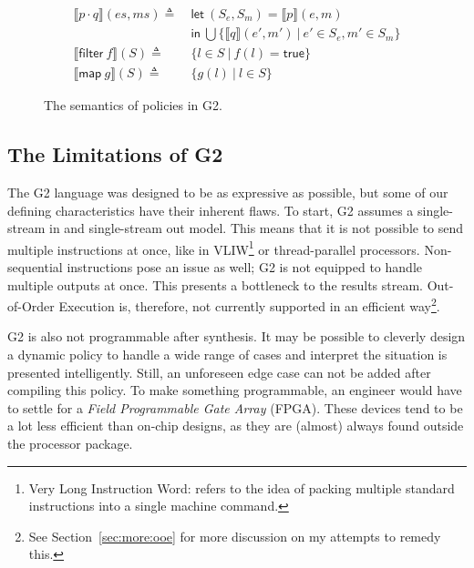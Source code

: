 \documentclass[sigconf,usenames,dvipsnames,svgnames,table]{acmart}
\newcommand{\interp}[1]{\llbracket #1 \rrbracket}
\def \sysname {\textsc{G2}\xspace}
\begin{document}
\begin{figure}
{\begin{align*}
            \interp { p \cdot q }(es, ms)
              \triangleq\ &
              \mathsf{let}\ (S_e, S_m) = \interp{p}(e, m)\\
              &\mathsf{in}\ \bigcup \{\interp{q}(e',m')\ |\ e'\in S_e, m'\in S_m\}\\
              \hline
            \interp{\mathsf{filter}\ f}(S)
              \triangleq\ & \{l \in S\ |\ f(l) = \mathsf{true}\}\\
            \interp{\mathsf{map}\ g}(S)
              \triangleq\ &
              \{ g(l)\ |\ l\in S \} 
          \end{align*}}
          \caption{The semantics of policies in \sysname.}
          \label{fig:spec:sem:pol}
        \end{figure}

    \subsection{The Limitations of \sysname}\label{sec:spec:lim}
      The \sysname language was designed to be as expressive as possible, but some of our defining characteristics have their inherent flaws.
      To start, \sysname assumes a single-stream in and single-stream out model.
      This means that it is not possible to send multiple instructions at once, like in VLIW\footnote{
      Very Long Instruction Word: refers to the idea of packing multiple standard instructions into a single machine command.} or thread-parallel processors.
      Non-sequential instructions pose an issue as well; \sysname is not equipped to handle multiple outputs at once.
      This presents a bottleneck to the results stream.
      Out-of-Order Execution is, therefore, not currently supported in an efficient way\footnote{See Section~\ref{sec:more:ooe} for more discussion on my attempts to remedy this.}.
      \par

      \sysname is also not programmable after synthesis.
      It may be possible to cleverly design a dynamic policy to handle a wide range of cases and interpret the situation is presented intelligently.
      Still, an unforeseen edge case can not be added after compiling this policy.
      To make something programmable, an engineer would have to settle for a \textit{Field Programmable Gate Array} (FPGA).
      These devices tend to be a lot less efficient than on-chip designs, as they are (almost) always found outside the processor package.
      \par
\end{document}
